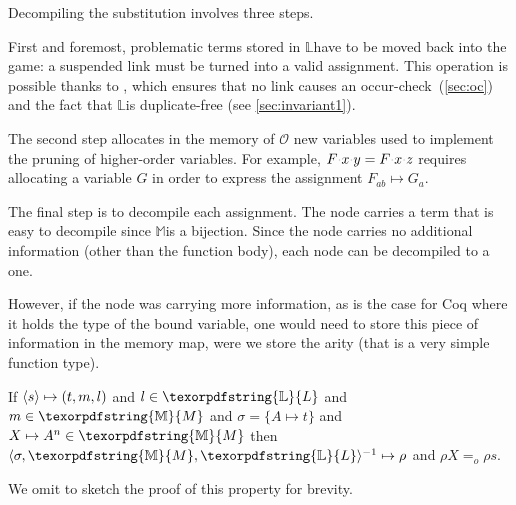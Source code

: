 \documentclass[sigconf,natbib=false,review]{acmart}
\newcommand{\appsep}{\ensuremath{\textcolor{lightgray}{\cdot}}}
\newcommand{\EqualRel}{\ensuremath{=}}
\newcommand{\Eo}{\ensuremath{\EqualRel_o}\xspace}
\newcommand{\Fo}{\texorpdfstring{\ensuremath{\mathcal{O}}\xspace}{O}}
\newcommand{\Ho}{\texorpdfstring{\ensuremath{\mathcal{M}}\xspace}{M}}
\newcommand{\mapping}[3]{\ensuremath{#1 \mapsto #2^#3}}
\newcommand{\linkStore}{\texorpdfstring{\ensuremath{\mathbb{L}}\xspace}{L}}
\newcommand{\mapStore}{\texorpdfstring{\ensuremath{\mathbb{M}}\xspace}{M}}
\begin{document}
Decompiling the substitution involves three steps.

First and foremost, problematic terms stored in
\linkStore have to be moved back into the game:
a suspended link must be turned into a valid assignment.
This operation is possible thanks to ,
which ensures that no link causes an occur-check~(\ref{sec:oc})
and the fact that \linkStore is duplicate-free (see \cref{sec:invariant1}).

The second step allocates
in the memory of \Fo{}
new variables used to implement the pruning of higher-order variables. 
For example,
$F\appsep x\appsep y = F\appsep x\appsep z$ requires allocating a 
variable $G$ in order to express the assignment $F_{ab} \mapsto G_a$.

The final step is to decompile each assignment. The 
node carries a term that is easy to decompile since \mapStore is a bijection.
Since the  node
carries no additional information (other than the function body),
each  node can be decompiled to a  one.

However, if the  node was carrying more information,
as is the case for Coq where it holds the type of the bound variable,
one would need to store this piece of information in the memory map,
were we store the arity (that is a very simple function type).

\begin{proposition}\label{prop:comprt}
  If $\langle s \rangle\mapsto(t,m,l)$ and $l \in \linkStore$ and $m \in \mapStore$
  and
  $\sigma = \{ A \mapsto t\}$ and $\mapping{X}{A}{n} \in \mapStore$
  then $\D{\sigma}{\mapStore}{\linkStore}{\rho}$ and
  $\rho X \Eo \rho s$.
\end{proposition}

We omit to sketch the proof of this property for brevity.

\end{document}
